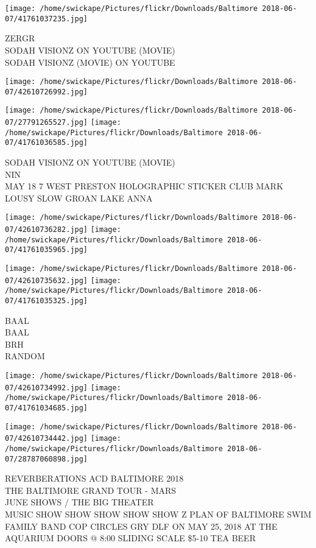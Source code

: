 \documentclass[10pt,letterpaper]{article}
\begin{document}
\texttt{[image: /home/swickape/Pictures/flickr/Downloads/Baltimore 2018-06-07/41761037235.jpg]}

ZERGR\\
SODAH VISIONZ ON YOUTUBE (MOVIE)\\
SODAH VISIONZ (MOVIE) ON YOUTUBE\\
\pagebreak

\texttt{[image: /home/swickape/Pictures/flickr/Downloads/Baltimore 2018-06-07/42610726992.jpg]}

\vspace{0.25in}
\texttt{[image: /home/swickape/Pictures/flickr/Downloads/Baltimore 2018-06-07/27791265527.jpg]}
\texttt{[image: /home/swickape/Pictures/flickr/Downloads/Baltimore 2018-06-07/41761036585.jpg]}

SODAH VISIONZ ON YOUTUBE (MOVIE)\\
NIN\\
MAY 18 7 WEST PRESTON HOLOGRAPHIC STICKER CLUB MARK LOUSY SLOW GROAN LAKE ANNA\\
\pagebreak

\texttt{[image: /home/swickape/Pictures/flickr/Downloads/Baltimore 2018-06-07/42610736282.jpg]}
\texttt{[image: /home/swickape/Pictures/flickr/Downloads/Baltimore 2018-06-07/41761035965.jpg]}

\texttt{[image: /home/swickape/Pictures/flickr/Downloads/Baltimore 2018-06-07/42610735632.jpg]}
\texttt{[image: /home/swickape/Pictures/flickr/Downloads/Baltimore 2018-06-07/41761035325.jpg]}

BAAL\\
BAAL\\
BRH\\
RANDOM\\
\pagebreak

\texttt{[image: /home/swickape/Pictures/flickr/Downloads/Baltimore 2018-06-07/42610734992.jpg]}
\texttt{[image: /home/swickape/Pictures/flickr/Downloads/Baltimore 2018-06-07/41761034685.jpg]}

\texttt{[image: /home/swickape/Pictures/flickr/Downloads/Baltimore 2018-06-07/42610734442.jpg]}
\texttt{[image: /home/swickape/Pictures/flickr/Downloads/Baltimore 2018-06-07/28787060898.jpg]}

REVERBERATIONS ACD BALTIMORE 2018\\
THE BALTIMORE GRAND TOUR {-} MARS\\
JUNE SHOWS / THE BIG THEATER\\
MUSIC SHOW SHOW SHOW SHOW SHOW Z PLAN OF BALTIMORE SWIM FAMILY BAND COP CIRCLES GRY DLF ON MAY 25, 2018 AT THE AQUARIUM DOORS @ 8:00 SLIDING SCALE \$5{-}10 TEA BEER\\
\pagebreak
\end{document}
